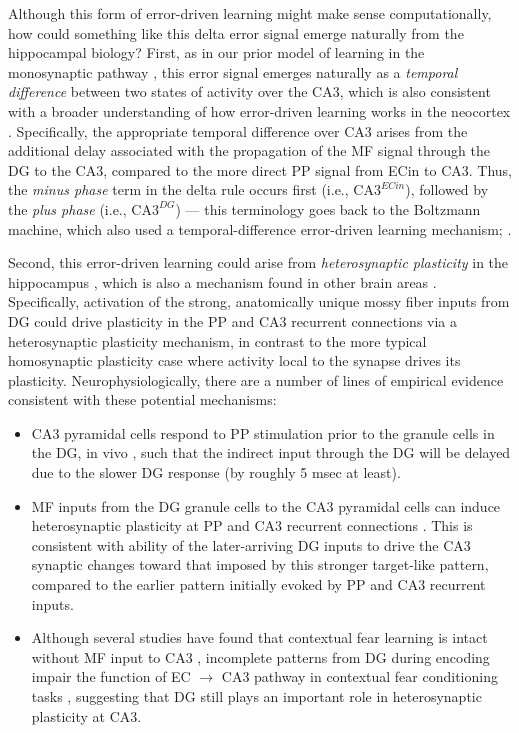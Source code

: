 \documentclass[11pt,twoside]{article}
\newif\myifpdf
\begin{document}
Although this form of error-driven learning might make sense computationally, how could something like this delta error signal emerge naturally from the hippocampal biology?  First, as in our prior model of learning in the monosynaptic pathway \citep{KetzMorkondaOReilly13}, this error signal emerges naturally as a \emph{temporal difference} between two states of activity over the CA3, which is also consistent with a broader understanding of how error-driven learning works in the neocortex \citep{OReilly96,OReillyMunakata00,OReillyRussinZolfagharEtAl21}. Specifically, the appropriate temporal difference over CA3 arises from the additional delay associated with the propagation of the MF signal through the DG to the CA3, compared to the more direct PP signal from ECin to CA3.  Thus, the \emph{minus phase} term in the delta rule occurs first (i.e., $\mbox{CA3}^{ECin}$), followed by the \emph{plus phase} (i.e., $\mbox{CA3}^{DG}$) --- this terminology goes back to the Boltzmann machine, which also used a temporal-difference error-driven learning mechanism; \citep{AckleyHintonSejnowski85}.

Second, this error-driven learning could arise from \emph{heterosynaptic plasticity} in the hippocampus \citep{Lee22}, which is also a mechanism found in other brain areas \citep{ChistiakovaBannonBazhenovEtAl14}.  Specifically, activation of the strong, anatomically unique mossy fiber inputs from DG could drive plasticity in the PP and CA3 recurrent connections via a heterosynaptic plasticity mechanism, in contrast to the more typical homosynaptic plasticity case where activity local to the synapse drives its plasticity.  Neurophysiologically, there are a number of lines of empirical evidence consistent with these potential mechanisms:
\begin{itemize}

	\item CA3 pyramidal cells respond to PP stimulation prior to the granule cells in the DG, in vivo \citep{YeckelBerger90,DoMartinezMartinezEtAl02}, such that the indirect input through the DG will be delayed due to the slower DG response (by roughly 5 msec at least).

    \item MF inputs from the DG granule cells to the CA3 pyramidal cells can induce heterosynaptic plasticity at PP and CA3 recurrent connections \citep{McMahonBarrionuevo02,TsukamotoYasuiYamadaEtAl03,KobayashiPoo04,RebolaCartaMulle17}. This is consistent with ability of the later-arriving DG inputs to drive the CA3 synaptic changes toward that imposed by this stronger target-like pattern, compared to the earlier pattern initially evoked by PP and CA3 recurrent inputs.

    \item Although several studies have found that contextual fear learning is intact without MF input to CA3 \citep{McHughJonesQuinnEtAl07,NakashibaCushmanPelkeyEtAl12,KitamuraSunMartinEtAl15}, incomplete patterns from DG during encoding impair the function of EC $\rightarrow$ CA3 pathway in contextual fear conditioning tasks \citep{BernierLacagninaAyoubEtAl17}, suggesting that DG still plays an important role in heterosynaptic plasticity at CA3.
\end{itemize}
\end{document}
